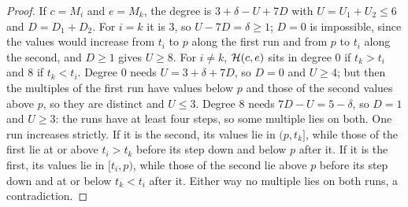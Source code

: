 \begin{proof}
If $c=M_{i}$ and $e=M_{k}$, the degree is $3+\delta-U+7D$ with
$U=U_{1}+U_{2}\le6$ and $D=D_{1}+D_{2}$. For $i=k$ it is $3$, so
$U-7D=\delta\ge1$; $D=0$ is impossible, since the values would increase from
$t_{i}$ to $p$ along the first run and from $p$ to $t_{i}$ along the second,
and $D\ge1$ gives $U\ge8$. For $i\ne k$, $\mathcal{H}(c,e)$ sits in degree $0$ if
$t_{k}>t_{i}$ and $8$ if $t_{k}<t_{i}$. Degree $0$ needs $U=3+\delta+7D$,
so $D=0$ and $U\ge4$; but then the multiples of the first run have values
below $p$ and those of the second values above $p$, so they are distinct and
$U\le3$. Degree $8$ needs $7D-U=5-\delta$, so $D=1$ and $U\ge3$: the runs
have at least four steps, so some multiple lies on both. One run increases
strictly. If it is the second, its values lie in $(p,t_{k}]$, while those of
the first lie at or above $t_{i}>t_{k}$ before its step down and below $p$
after it. If it is the first, its values lie in $[t_{i},p)$, while those of
the second lie above $p$ before its step down and at or below $t_{k}<t_{i}$
after it. Either way no multiple lies on both runs, a contradiction.


\end{proof}
